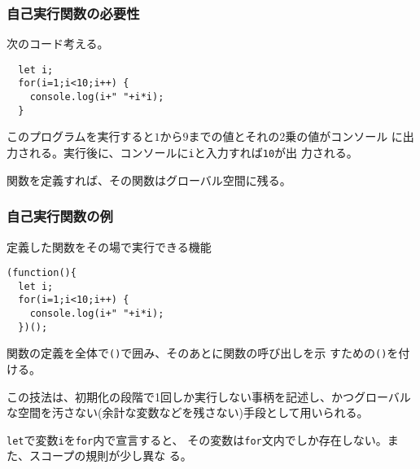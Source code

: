 \begin{frame}[containsverbatim]
\frametitle{自己実行関数の必要性}
次のコード考える。
\begin{Verbatim}
  let i;
  for(i=1;i<10;i++) {
    console.log(i+" "+i*i);
  }
\end{Verbatim}
このプログラムを実行すると$1$から$9$までの値とそれの2乗の値がコンソール
に出力される。実行後に、コンソールに\Verb+i+と入力すれば\Verb+10+が出
力される。

関数を定義すれば、その関数はグローバル空間に残る。
\end{frame}
\begin{frame}[containsverbatim]
\frametitle{自己実行関数の例}
定義した関数をその場で実行できる機能
\begin{Verbatim}
(function(){
  let i;
  for(i=1;i<10;i++) {
    console.log(i+" "+i*i);
  })();
\end{Verbatim}
関数の定義を全体で\Verb+()+で囲み、そのあとに関数の呼び出しを示
すための\Verb+()+を付ける。

この技法は、初期化の段階で1回しか実行しない事柄を記述し、かつグローバル
 な空間を汚さない(余計な変数などを残さない)手段として用いられる。

 \texttt{let}で変数\Verb+i+を\texttt{for}内で宣言すると、
その変数は\texttt{for}文内でしか存在しない。また、スコープの規則が少し異な
る。
\end{frame}
